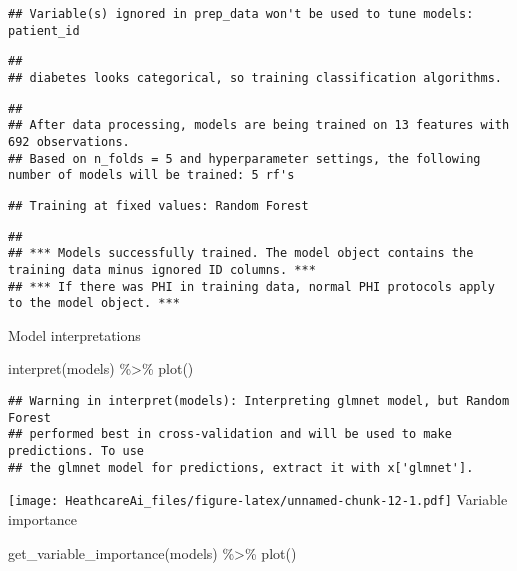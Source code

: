 \documentclass[
]{article}
\newenvironment{Shaded}{\begin{snugshade}}{\end{snugshade}}
\newcommand{\FunctionTok}[1]{\textcolor[rgb]{0.00,0.00,0.00}{#1}}
\newcommand{\NormalTok}[1]{#1}
\newcommand{\SpecialCharTok}[1]{\textcolor[rgb]{0.00,0.00,0.00}{#1}}
\begin{document}
\begin{verbatim}
## Variable(s) ignored in prep_data won't be used to tune models: patient_id
\end{verbatim}

\begin{verbatim}
## 
## diabetes looks categorical, so training classification algorithms.
\end{verbatim}

\begin{verbatim}
## 
## After data processing, models are being trained on 13 features with 692 observations.
## Based on n_folds = 5 and hyperparameter settings, the following number of models will be trained: 5 rf's
\end{verbatim}

\begin{verbatim}
## Training at fixed values: Random Forest
\end{verbatim}

\begin{verbatim}
## 
## *** Models successfully trained. The model object contains the training data minus ignored ID columns. ***
## *** If there was PHI in training data, normal PHI protocols apply to the model object. ***
\end{verbatim}

Model interpretations

\begin{Shaded}
\begin{Highlighting}[]
\FunctionTok{interpret}\NormalTok{(models) }\SpecialCharTok{\%\textgreater{}\%}
  \FunctionTok{plot}\NormalTok{()}
\end{Highlighting}
\end{Shaded}

\begin{verbatim}
## Warning in interpret(models): Interpreting glmnet model, but Random Forest
## performed best in cross-validation and will be used to make predictions. To use
## the glmnet model for predictions, extract it with x['glmnet'].
\end{verbatim}

\texttt{[image: HeathcareAi\_files/figure-latex/unnamed-chunk-12-1.pdf]}
Variable importance

\begin{Shaded}
\begin{Highlighting}[]
\FunctionTok{get\_variable\_importance}\NormalTok{(models) }\SpecialCharTok{\%\textgreater{}\%}
  \FunctionTok{plot}\NormalTok{()}
\end{Highlighting}
\end{Shaded}
\end{document}
